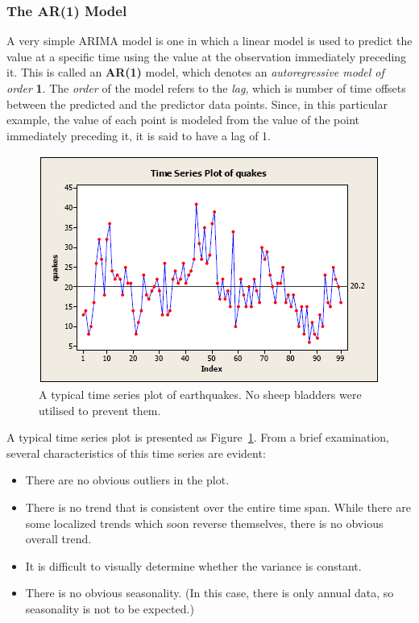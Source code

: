 \documentclass[12pt]{article}
\begin{document}
\subsubsection{The AR(1) Model}
A very simple ARIMA model is one in which a linear model is used to predict the value at a specific time using the value at the observation immediately preceding it. This is called an \textbf{AR(1)} model, which denotes an \textit{autoregressive model of order} \textbf{1}. The \textit{order} of the model refers to the \textit{lag}, which is number of time offsets between the predicted and the predictor data points. Since, in this particular example, the value of each point is modeled from the value of the point immediately preceding it, it is said to have a lag of 1.
\begin{figure}
	\includegraphics[width=\textwidth, keepaspectratio]{TimeSeriesArima1.png}
	\caption{A typical time series plot of earthquakes. No sheep bladders were utilised to prevent them.}
	\label{fig:arima1}
\end{figure}
A typical time series plot is presented as Figure~\ref{fig:arima1}. From a brief examination, several characteristics of this time series are evident:
\begin{itemize}
\item There are no obvious outliers in the plot.
\item There is no trend that is consistent over the entire time span. While there are some localized trends which soon reverse themselves, there is no obvious overall trend.
\item It is difficult to visually determine whether the variance is constant.
\item There is no obvious seasonality. (In this case, there is only annual data, so seasonality is not to be expected.)
\end{itemize}
\end{document}

